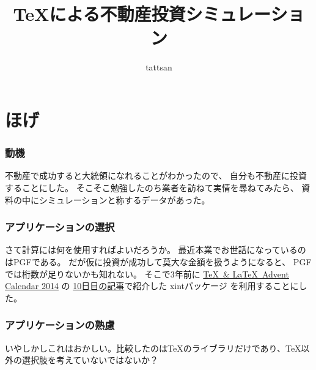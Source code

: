 \documentclass[dvipdfmx]{beamer}
\title{\TeX による不動産投資シミュレーション}
\author{tattsan}
\date{}
\newcommand{\たつ}{たつ}
\begin{document}
\begin{frame}\frametitle{}
\maketitle
\end{frame}

\section{ほげ} 

\begin{frame}[fragile]\frametitle{動機}
  不動産で成功すると\alert{大統領になれる}ことがわかったので、
  自分も不動産に投資することにした。
  そこそこ勉強したのち業者を訪ねて実情を尋ねてみたら、
  資料の中にシミュレーションと称するデータがあった。
\begin{block}{}\small
  \begin{dialogue}
    \speak{\たつ} 
      
  \end{dialogue}
\end{block}
\end{frame}


\begin{frame}[fragile]\frametitle{アプリケーションの選択}
  さて計算には何を使用すればよいだろうか。
  最近本業でお世話になっているのはPGFである。
  だが仮に投資が成功して莫大な金額を扱うようになると、
  PGFでは\alert{桁数が足りないかも}知れない。
  そこで3年前に
  \href{https://adventar.org/calendars/553}{\TeX ~\& \LaTeX ~Advent Calendar 2014} の
  \href{https://github.com/tattsan/xkansuji/wiki/texadventar14}{10日目の記事}で紹介した
  \alert{\textsf{xintパッケージ}}
  を利用することにした。
\end{frame}

\begin{frame}[fragile]\frametitle{アプリケーションの熟慮}
  いやしかしこれはおかしい。比較したのは\TeX のライブラリだけであり、\TeX 以外の選択肢を考えていないではないか？
  \bigskip\par
  \bigskip\par
\end{frame}
\end{document}
